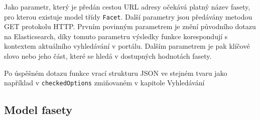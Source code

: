 Jako parametr, který je předán cestou URL adresy očekává platný název fasety, pro kterou existuje model třídy \texttt{Facet}. Další parametry jsou předávány metodou GET protokolu HTTP. Prvním povinným parametrem je znění původního dotazu na Elasticsearch, díky tomuto parametru výsledky funkce korespondují s kontextem aktuálního vyhledávání v portálu. Dalším parametrem je pak klíčové slovo nebo jeho část, které se hledá v dostupných hodnotách fasety. 

Po úspěšném dotazu funkce vrací strukturu JSON ve stejném tvaru jako například v \texttt{checkedOptions} zmiňovaném v kapitole Vyhledávání %

\subsection{Model fasety}
